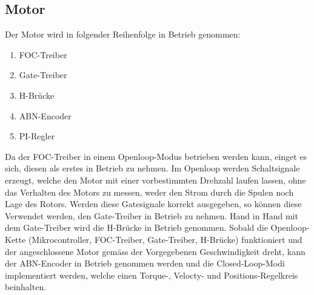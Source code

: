 \newpage
\subsection{Motor}
\label{subsec:Inbetriebnahme_Motor}

Der Motor wird in folgender Reihenfolge in Betrieb genommen:

\begin{enumerate}
\item FOC-Treiber
\item Gate-Treiber
\item H-Brücke
\item ABN-Encoder
\item PI-Regler
\end{enumerate}

Da der FOC-Treiber in einem Openloop-Modus betrieben werden kann, einget es sich, diesen als erstes in Betrieb zu nehmen. Im Openloop werden Schaltsignale erzeugt, welche den Motor mit einer vorbestimmten Drehzahl laufen lassen, ohne das Verhalten des Motors zu messen, weder den Strom durch die Spulen noch Lage des Rotors. Werden diese Gatesignale korrekt ausgegeben, so können diese Verwendet werden, den Gate-Treiber in Betrieb zu nehmen. Hand in Hand mit dem Gate-Treiber wird die H-Brücke in Betrieb genommen. Sobald die Openloop-Kette (Mikrocontroller, FOC-Treiber, Gate-Treiber, H-Brücke) funktioniert und der angeschlossene Motor gemäss der Vorgegebenen Geschwindigkeit dreht, kann der ABN-Encoder in Betrieb genommen werden und die Closed-Loop-Modi implementiert werden, welche einen Torque-, Velocty- und Positions-Regelkreis beinhalten.

